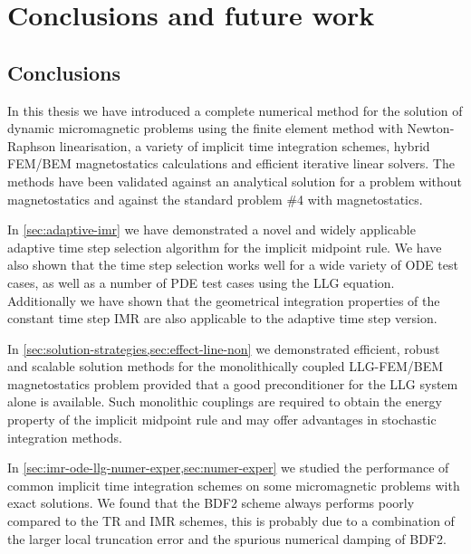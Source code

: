 \chapter{Conclusions and future work}

\section{Conclusions}

In this thesis we have introduced a complete numerical method for the solution of dynamic micromagnetic problems using the finite element method with Newton-Raphson linearisation, a variety of implicit time integration schemes, hybrid FEM/BEM magnetostatics calculations and efficient iterative linear solvers.
The methods have been validated against an analytical solution for a problem without magnetostatics and against the \mumag standard problem \#4 with magnetostatics.

In \cref{sec:adaptive-imr} we have demonstrated a novel and widely applicable adaptive time step selection algorithm for the implicit midpoint rule.
We have also shown that the time step selection works well for a wide variety of ODE test cases, as well as a number of PDE test cases using the LLG equation.
Additionally we have shown that the geometrical integration properties of the constant time step IMR are also applicable to the adaptive time step version.

In \cref{sec:solution-strategies,sec:effect-line-non} we demonstrated efficient, robust and scalable solution methods for the monolithically coupled LLG-FEM/BEM magnetostatics problem provided that a good preconditioner for the LLG system alone is available.
Such monolithic couplings are required to obtain the energy property of the implicit midpoint rule and may offer advantages in stochastic integration methods.

In \cref{sec:imr-ode-llg-numer-exper,sec:numer-exper} we studied the performance of common implicit time integration schemes on some micromagnetic problems with exact solutions.
We found that the BDF2 scheme always performs poorly compared to the TR and IMR schemes, this is probably due to a combination of the larger local truncation error and the spurious numerical damping of BDF2.

